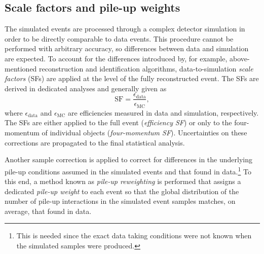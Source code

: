 \subsection{Scale factors and pile-up weights}
The simulated events are processed through a complex detector simulation in order to be directly comparable to data events. 
This procedure cannot be performed with arbitrary accuracy, so differences between data and simulation are expected.
To account for the differences introduced by, for example, above-mentioned reconstruction and identification algorithms, data-to-simulation \emph{scale factors} (SFs) are applied at the level of the fully reconstructed event. The SFs are derived in dedicated analyses and generally given as
\begin{equation}
    \text{SF} = \frac{\epsilon_\text{data}}{\epsilon_{\text{MC}}},
\end{equation}
where $\epsilon_\text{data}$ and $\epsilon_\text{MC}$ are efficiencies measured in data and simulation, respectively.
The SFs are either applied to the full event (\emph{efficiency SF}) or only to the four-momentum of individual objects (\emph{four-momentum SF}). 
Uncertainties on these corrections are propagated to the final statistical analysis.

Another sample correction is applied to correct for differences in the underlying pile-up conditions assumed in the simulated events and that found in data.\footnote{This is needed since the exact data taking conditions were not known when the simulated samples were produced.}
To this end, a method known as \emph{pile-up reweighting} is performed that assigns a dedicated \emph{pile-up weight} to each event so that the global distribution of the number of pile-up interactions in the simulated event samples matches, on average, that found in data. 









